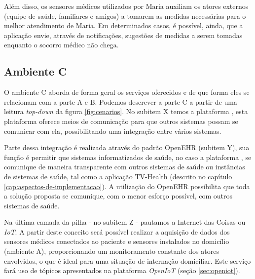 Além disso, os sensores médicos utilizados por Maria auxiliam os atores
externos (equipe de saúde, familiares e amigos) a tomarem as medidas
necessárias para o melhor atendimento de Maria.  Em determinados casos, é
possível, ainda, que a aplicação envie, através de notificações, sugestões de
medidas a serem tomadas enquanto o socorro médico não chega.

\subsection{Ambiente C} \label{subsec:ambiente-c}

O ambiente C aborda de forma geral os serviços oferecidos e de que forma eles se
relacionam com a parte A e B. Podemos descrever a parte C a partir de uma leitura 
\textit{top-down} da figura \ref{fig:cenarios}. No subitem X temos a plataforma
\nextsaude[], esta plataforma oferece meios de comunicação para que outros sistemas
possam se comunicar com ela, possibilitando uma integração entre vários sistemas.

Parte dessa integração é realizada através do padrão OpenEHR (subitem Y), sua 
função é permitir que sistemas informatizados de saúde, no caso a plataforma
\nextsaude[], se comunique de maneira transparente com outros sistemas de saúde ou
instâncias de sistemas de saúde, tal como a aplicação TV-Health (descrito no capítulo
\ref{cap:aspectos-de-implementacao}). A utilização do OpenEHR possibilita que toda a solução
proposta se comunique, com o menor esforço possível, com outros sistemas de 
saúde.

Na última camada da pilha - no subitem Z - pautamos a Internet das Coisas ou
\textit{IoT}. A partir deste conceito será possível realizar a aquisição de
dados dos sensores médicos conectados ao paciente e sensores instalados no domicílio
(ambiente A), proporcionando um monitoramento constante dos atores envolvidos, 
o que é ideal para uma situação de internação domiciliar. Este serviço fará uso 
de tópicos apresentados na plataforma \textit{OpenIoT}
(seção \vref{sec:openiot}).



